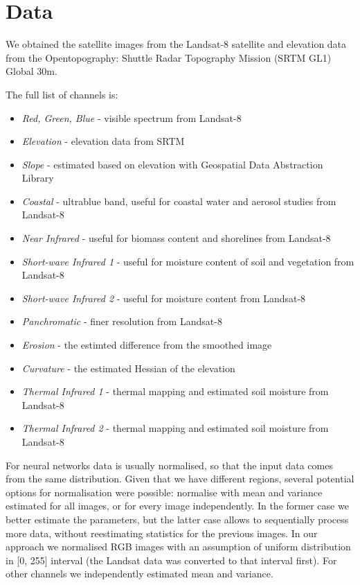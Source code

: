 \documentclass[11pt,a4paper]{article}
\begin{document}

\section{Data}

We obtained the satellite images from the Landsat-8 satellite and elevation data from the Opentopography: Shuttle Radar
Topography Mission (SRTM GL1) Global 30m.

The full list of channels is:
\begin{itemize}
\item \textit{Red, Green, Blue} - visible spectrum from Landsat-8
\item \textit{Elevation} - elevation data from SRTM
\item \textit{Slope} - estimated based on elevation with Geospatial Data Abstraction Library
\item \textit{Coastal} - ultrablue band, useful for coastal water and aerosol studies from Landsat-8
\item \textit{Near Infrared} - useful for biomass content and shorelines from Landsat-8
\item \textit{Short-wave Infrared 1} - useful for moisture content of soil and vegetation from Landsat-8
\item \textit{Short-wave Infrared 2} - useful for moisture content from Landsat-8
\item \textit{Panchromatic} - finer resolution from Landsat-8
\item \textit{Erosion} - the estimted difference from the smoothed image
\item \textit{Curvature} - the estimated Hessian of the elevation
\item \textit{Thermal Infrared 1} - thermal mapping and estimated soil moisture from Landsat-8
\item \textit{Thermal Infrared 2} - thermal mapping and estimated soil moisture from Landsat-8
\end{itemize}

For neural networks data is usually normalised, so that the input data comes from the same distribution. Given that we
have different regions, several potential options for normalisation were possible: normalise with mean and variance
estimated for all images, or for every image independently. In the former case we better estimate the parameters, but
the latter case allows to sequentially process more data, without reestimating statistics for the previous images. In
our approach we normalised RGB images with an assumption of uniform distribution in [0, 255] interval
(the Landsat data was converted to that interval first). For other channels we independently estimated mean and variance.
\end{document}
